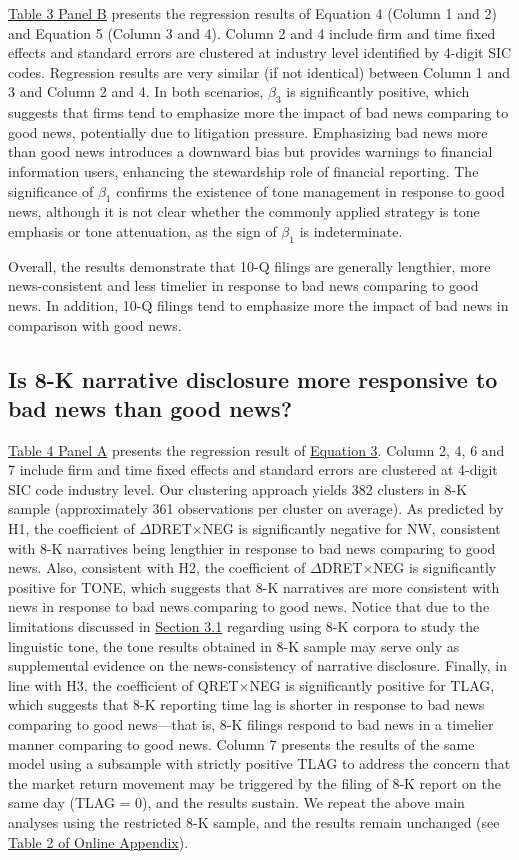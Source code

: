 \documentclass[a4paper]{article}
\begin{document}
\begin{spacing}{2}
\hyperref[T3PB]{Table 3 Panel B} presents the regression results of Equation 4 (Column 1 and 2) and Equation 5 (Column 3 and 4). Column 2 and 4 include firm and time fixed effects and standard errors are clustered at industry level identified by 4-digit SIC codes. Regression results are very similar (if not identical) between Column 1 and 3 and Column 2 and 4. In both scenarios, $\beta_3$ is significantly positive, which suggests that firms tend to emphasize more the impact of bad news comparing to good news, potentially due to litigation pressure. Emphasizing bad news more than good news introduces a downward bias but provides warnings to financial information users, enhancing the stewardship role of financial reporting. The significance of $\beta_1$ confirms the existence of tone management in response to good news, although it is not clear whether the commonly applied strategy is tone emphasis or tone attenuation, as the sign of $\beta_1$ is indeterminate.

Overall, the results demonstrate that 10-Q filings are generally lengthier, more news-consistent and less timelier in response to bad news comparing to good news. In addition, 10-Q filings tend to emphasize more the impact of bad news in comparison with good news. 

\subsection{Is 8-K narrative disclosure more responsive to bad news than good news?}
\hyperref[T4PA]{Table 4 Panel A} presents the regression result of \hyperref[eq3]{Equation 3}. Column 2, 4, 6 and 7 include firm and time fixed effects and standard errors are clustered at 4-digit SIC code industry level. Our clustering approach yields 382 clusters in 8-K sample (approximately 361 observations per cluster on average). As predicted by H1, the coefficient of $\Delta$DRET$\times$NEG is significantly negative for NW, consistent with 8-K narratives being lengthier in response to bad news comparing to good news. Also, consistent with H2, the coefficient of $\Delta$DRET$\times$NEG is significantly positive for TONE, which suggests that 8-K narratives are more consistent with news in response to bad news comparing to good news. Notice that due to the limitations discussed in \hyperref[sec3.1]{Section 3.1} regarding using 8-K corpora to study the linguistic tone, the tone results obtained in 8-K sample may serve only as supplemental evidence on the news-consistency of narrative disclosure. Finally, in line with H3, the coefficient of QRET$\times$NEG is significantly positive for TLAG, which suggests that 8-K reporting time lag is shorter in response to bad news comparing to good news---that is, 8-K filings respond to bad news in a timelier manner comparing to good news. Column 7 presents the results of the same model using a subsample with strictly positive TLAG to address the concern that the market return movement may be triggered by the filing of 8-K report on the same day (TLAG = 0), and the results sustain. We repeat the above main analyses using the restricted 8-K sample, and the results remain unchanged (see \hyperref[oat2]{Table 2 of Online Appendix}).


\end{spacing}
\end{document}
